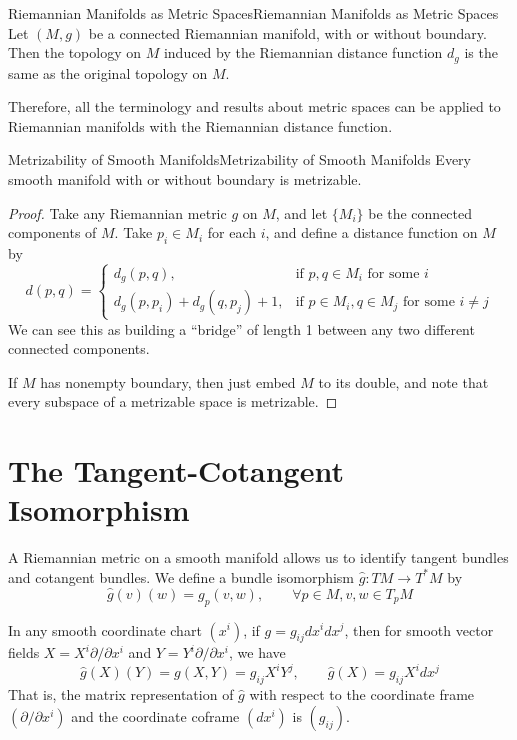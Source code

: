 \documentclass[../main.tex]{subfiles}
\begin{document}
\begin{theorem}{Riemannian Manifolds as Metric Spaces}{Riemannian Manifolds as Metric Spaces}
  Let $(M,g)$ be a connected Riemannian manifold, with or without boundary. Then the topology on $M$ induced by the Riemannian distance function $d_g$ is the same as the original topology on $M$.
\end{theorem}

Therefore, all the terminology and results about metric spaces can be applied to Riemannian manifolds with the Riemannian distance function.

\begin{corollary}{Metrizability of Smooth Manifolds}{Metrizability of Smooth Manifolds}
  Every smooth manifold with or without boundary is metrizable.
\end{corollary}
\begin{proof}
  Take any Riemannian metric $g$ on $M$, and let $\{M_i\}$ be the connected components of $M$. Take $p_i\in M_i$ for each $i$, and define a distance function on $M$ by
  \begin{equation*}
    d(p,q) = \begin{cases}
      d_g(p,q), & \text{if } p,q\in M_i \text{ for some } i \\
      d_g(p,p_i) + d_g(q,p_j) + 1, & \text{if } p\in M_i, q\in M_j \text{ for some } i\neq j
    \end{cases}
  \end{equation*}
  We can see this as building a ``bridge'' of length 1 between any two different connected components.

  If $M$ has nonempty boundary, then just embed $M$ to its double, and note that every subspace of a metrizable space is metrizable.
\end{proof}

\section{The Tangent-Cotangent Isomorphism}
A Riemannian metric on a smooth manifold allows us to identify tangent bundles and cotangent bundles. We define a bundle isomorphism $\hat{g}: TM \to T^*M$ by
\begin{equation}
  \hat{g}(v)(w) = g_p(v,w), \qquad \forall p\in M, v,w\in T_pM
\end{equation}

In any smooth coordinate chart $(x^i)$, if $g = g_{ij}dx^i dx^j$, then for smooth vector fields $X = X^i \partial/\partial x^i$ and $Y = Y^i \partial/\partial x^i$, we have
\begin{equation*}
  \hat{g}(X)(Y) = g(X,Y) = g_{ij}X^i Y^j, \qquad \hat{g}(X) = g_{ij}X^i dx^j
\end{equation*}
That is, the matrix representation of $\hat{g}$ with respect to the coordinate frame $(\partial/\partial x^i)$ and the coordinate coframe $(dx^i)$ is $(g_{ij})$.
\end{document}
